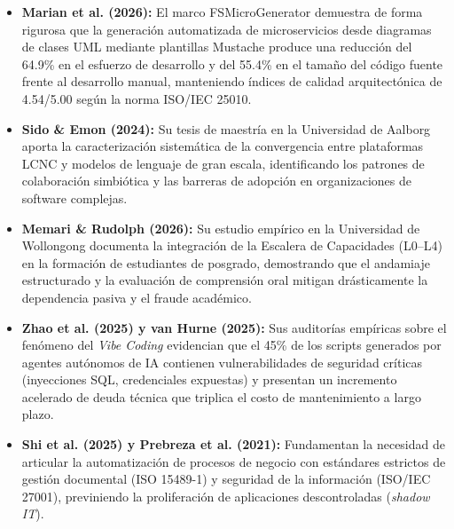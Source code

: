 \begin{itemize}[leftmargin=1.5em]
    \item \textbf{Marian et al. (2026):} El marco FSMicroGenerator demuestra de forma rigurosa que la generación automatizada de microservicios desde diagramas de clases UML mediante plantillas Mustache produce una reducción del 64.9\% en el esfuerzo de desarrollo y del 55.4\% en el tamaño del código fuente frente al desarrollo manual, manteniendo índices de calidad arquitectónica de 4.54/5.00 según la norma ISO/IEC 25010.
    \item \textbf{Sido \& Emon (2024):} Su tesis de maestría en la Universidad de Aalborg aporta la caracterización sistemática de la convergencia entre plataformas LCNC y modelos de lenguaje de gran escala, identificando los patrones de colaboración simbiótica y las barreras de adopción en organizaciones de software complejas.
    \item \textbf{Memari \& Rudolph (2026):} Su estudio empírico en la Universidad de Wollongong documenta la integración de la Escalera de Capacidades (L0--L4) en la formación de estudiantes de posgrado, demostrando que el andamiaje estructurado y la evaluación de comprensión oral mitigan drásticamente la dependencia pasiva y el fraude académico.
    \item \textbf{Zhao et al. (2025) y van Hurne (2025):} Sus auditorías empíricas sobre el fenómeno del \textit{Vibe Coding} evidencian que el 45\% de los scripts generados por agentes autónomos de IA contienen vulnerabilidades de seguridad críticas (inyecciones SQL, credenciales expuestas) y presentan un incremento acelerado de deuda técnica que triplica el costo de mantenimiento a largo plazo.
    \item \textbf{Shi et al. (2025) y Prebreza et al. (2021):} Fundamentan la necesidad de articular la automatización de procesos de negocio con estándares estrictos de gestión documental (ISO 15489-1) y seguridad de la información (ISO/IEC 27001), previniendo la proliferación de aplicaciones descontroladas (\textit{shadow IT}).
\end{itemize}

